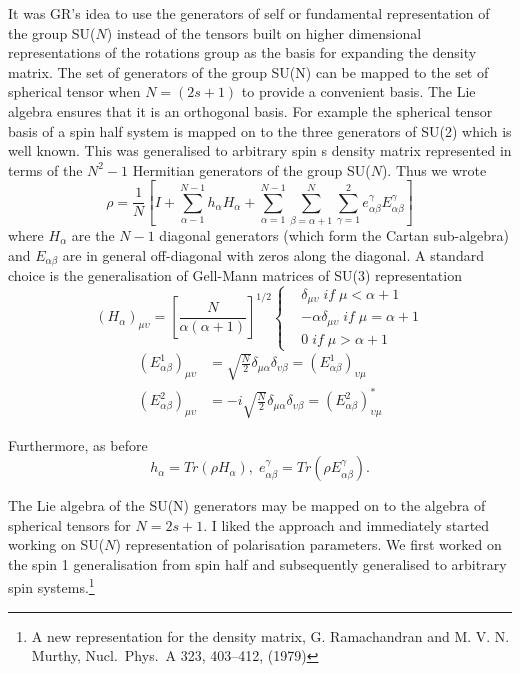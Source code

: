 It was GR’s idea to use the generators of self or fundamental representation of the group SU($N$) instead of the tensors built on higher dimensional representations of the rotations group as the basis for expanding the density
matrix. The set of generators of the group SU(N) can be mapped to the set of spherical tensor when $N = (2s + 1)$ to provide a convenient basis. The Lie algebra ensures that it is an orthogonal basis. For example the spherical tensor basis of a spin half system is mapped on to the three generators of SU(2) which is well known. This was generalised to arbitrary spin s density matrix represented in terms of the $N^{2}-1$ Hermitian generators of the group SU($N$). Thus we wrote
$$
\rho = \dfrac{1}{N}\left[I + \sum\limits_{\alpha-1}^{N-1}h_{\alpha}H_{\alpha} + \sum\limits_{\alpha=1}^{N-1}\sum\limits_{\beta=\alpha+1}^{N}\sum\limits_{\gamma=1}^{2} e_{\alpha \beta}^{\gamma}E_{\alpha \beta}^{\gamma}\right]
$$
where $H_{\alpha}$ are the $N-1$ diagonal generators (which form the Cartan sub-algebra) and $E_{\alpha\beta}$ are in general off-diagonal with zeros along the diagonal. A standard choice is the generalisation of Gell-Mann matrices of SU(3) representation
\begin{equation*}
(H_{\alpha})_{\mu\upsilon} = \left[\dfrac{N}{\alpha(\alpha + 1)}\right]^{1/2} 
\begin{cases} 
& \delta_{\mu\upsilon}\; if\; \mu < \alpha + 1\\
& -\alpha \delta_{\mu\upsilon}\; if\; \mu=\alpha + 1\\
& 0\; if\; \mu > \alpha + 1 
\end{cases}
\end{equation*}
\begin{align*}
(E_{\alpha \beta}^{1})_{\mu\upsilon} &= \sqrt{\frac{N}{2}} \delta_{\mu \alpha} \delta_{\upsilon\beta} = (E_{\alpha \beta}^{1})_{\upsilon \mu}\\
(E_{\alpha \beta}^{2})_{\mu\upsilon} &= -i\sqrt{\frac{N}{2}} \delta_{\mu \alpha} \delta_{\upsilon\beta} = (E_{\alpha \beta}^{2})_{\upsilon \mu}^{\ast}
\end{align*}

Furthermore, as before
$$
h_{\alpha}= Tr(\rho H_{\alpha}), \; e_{\alpha \beta}^{\gamma}= Tr(\rho E_{\alpha\beta}^{\gamma}).
$$

The Lie algebra of the SU(N) generators may be mapped on to the algebra of spherical tensors for $N = 2s+1$. I liked the approach and immediately started working on SU($N$) representation of polarisation parameters. We first worked on the spin 1 generalisation from spin half and subsequently generalised to arbitrary spin systems.\footnote{A new representation for the density matrix, G. Ramachandran and M. V. N. Murthy, Nucl.\ Phys.\ A 323, 403--412, (1979)} 

